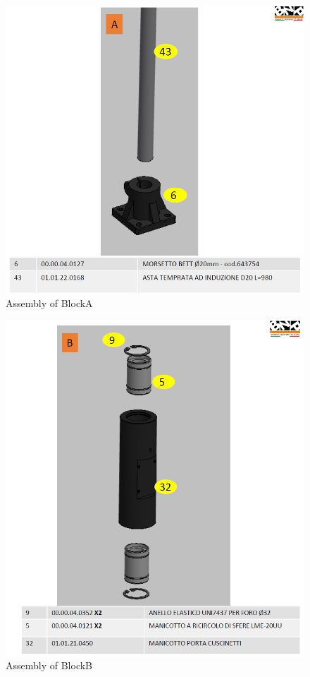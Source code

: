 \begin{figure} [h]
\centering
\includegraphics[width=1.0
\textwidth]{figures/Magistrale/ass_obj_1}
\caption[BlockA Assembly]{Assembly of BlockA
\label{fig:ass_obj_1}}
\end{figure} 

\begin{figure} [h]
\centering
\includegraphics[width=1.0
\textwidth]{figures/Magistrale/ass_obj_2}
\caption[BlockB Assembly]{Assembly of BlockB
\label{fig:ass_obj_2}}
\end{figure} 

